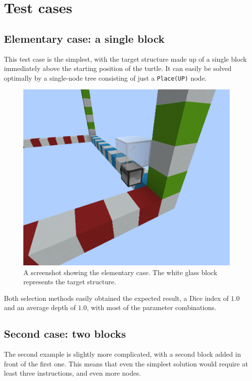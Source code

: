 \documentclass{report}
\begin{document}
\section{Test cases}

\subsection{Elementary case: a single block}
This test case is the simplest, with the target structure made up of a single block immediately above the starting position of the turtle. It can easily be solved optimally by a single-node tree consisting of just a \verb|Place(UP)| node.

\begin{figure}[H]
    \centering
    \includegraphics[scale=0.3]{minecraft2}
    \caption{A screenshot showing the elementary case. The white glass block represents the target structure.}
\end{figure}

Both selection methods easily obtained the expected result, a Dice index of $1.0$ and an average depth of $1.0$, with most of the parameter combinations.

\subsection{Second case: two blocks}

The second example is slightly more complicated, with a second block added in front of the first one. This means that even the simplest solution would require at least three instructions, and even more nodes.
\end{document}
